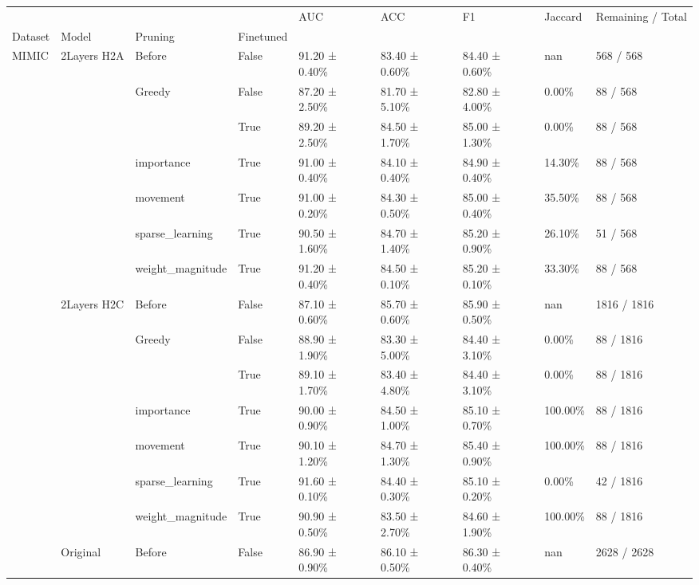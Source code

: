 \begin{tabular}{lllllllll}
\toprule
 &  &  &  & AUC & ACC & F1 & Jaccard & Remaining / Total \\
Dataset & Model & Pruning & Finetuned &  &  &  &  &  \\
\midrule
\multirow[t]{35}{*}{MIMIC} & \multirow[t]{7}{*}{2Layers H2A} & Before & False & 91.20 ± 0.40\% & 83.40 ± 0.60\% & 84.40 ± 0.60\% & nan & 568 / 568 \\
\cline{3-9}
 &  & \multirow[t]{2}{*}{Greedy} & False & 87.20 ± 2.50\% & 81.70 ± 5.10\% & 82.80 ± 4.00\% & 0.00\% & 88 / 568 \\
 &  &  & True & 89.20 ± 2.50\% & 84.50 ± 1.70\% & 85.00 ± 1.30\% & 0.00\% & 88 / 568 \\
\cline{3-9}
 &  & importance & True & 91.00 ± 0.40\% & 84.10 ± 0.40\% & 84.90 ± 0.40\% & 14.30\% & 88 / 568 \\
\cline{3-9}
 &  & movement & True & 91.00 ± 0.20\% & 84.30 ± 0.50\% & 85.00 ± 0.40\% & 35.50\% & 88 / 568 \\
\cline{3-9}
 &  & sparse\_learning & True & 90.50 ± 1.60\% & 84.70 ± 1.40\% & 85.20 ± 0.90\% & 26.10\% & 51 / 568 \\
\cline{3-9}
 &  & weight\_magnitude & True & 91.20 ± 0.40\% & 84.50 ± 0.10\% & 85.20 ± 0.10\% & 33.30\% & 88 / 568 \\
\cline{2-9} \cline{3-9}
 & \multirow[t]{7}{*}{2Layers H2C} & Before & False & 87.10 ± 0.60\% & 85.70 ± 0.60\% & 85.90 ± 0.50\% & nan & 1816 / 1816 \\
\cline{3-9}
 &  & \multirow[t]{2}{*}{Greedy} & False & 88.90 ± 1.90\% & 83.30 ± 5.00\% & 84.40 ± 3.10\% & 0.00\% & 88 / 1816 \\
 &  &  & True & 89.10 ± 1.70\% & 83.40 ± 4.80\% & 84.40 ± 3.10\% & 0.00\% & 88 / 1816 \\
\cline{3-9}
 &  & importance & True & 90.00 ± 0.90\% & 84.50 ± 1.00\% & 85.10 ± 0.70\% & 100.00\% & 88 / 1816 \\
\cline{3-9}
 &  & movement & True & 90.10 ± 1.20\% & 84.70 ± 1.30\% & 85.40 ± 0.90\% & 100.00\% & 88 / 1816 \\
\cline{3-9}
 &  & sparse\_learning & True & 91.60 ± 0.10\% & 84.40 ± 0.30\% & 85.10 ± 0.20\% & 0.00\% & 42 / 1816 \\
\cline{3-9}
 &  & weight\_magnitude & True & 90.90 ± 0.50\% & 83.50 ± 2.70\% & 84.60 ± 1.90\% & 100.00\% & 88 / 1816 \\
\cline{2-9} \cline{3-9}
 & \multirow[t]{7}{*}{Original} & Before & False & 86.90 ± 0.90\% & 86.10 ± 0.50\% & 86.30 ± 0.40\% & nan & 2628 / 2628 \\

\end{tabular}
